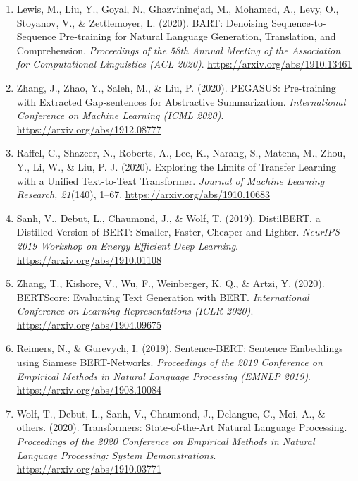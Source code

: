 \documentclass[12pt, a4paper]{report}
\begin{document}
\begin{enumerate}[leftmargin=*]
    \item Lewis, M., Liu, Y., Goyal, N., Ghazvininejad, M., Mohamed, A., Levy, O., Stoyanov, V., \& Zettlemoyer, L. (2020). BART: Denoising Sequence-to-Sequence Pre-training for Natural Language Generation, Translation, and Comprehension. \textit{Proceedings of the 58th Annual Meeting of the Association for Computational Linguistics (ACL 2020)}. \url{https://arxiv.org/abs/1910.13461}

    \item Zhang, J., Zhao, Y., Saleh, M., \& Liu, P. (2020). PEGASUS: Pre-training with Extracted Gap-sentences for Abstractive Summarization. \textit{International Conference on Machine Learning (ICML 2020)}. \url{https://arxiv.org/abs/1912.08777}

    \item Raffel, C., Shazeer, N., Roberts, A., Lee, K., Narang, S., Matena, M., Zhou, Y., Li, W., \& Liu, P. J. (2020). Exploring the Limits of Transfer Learning with a Unified Text-to-Text Transformer. \textit{Journal of Machine Learning Research, 21}(140), 1--67. \url{https://arxiv.org/abs/1910.10683}

    \item Sanh, V., Debut, L., Chaumond, J., \& Wolf, T. (2019). DistilBERT, a Distilled Version of BERT: Smaller, Faster, Cheaper and Lighter. \textit{NeurIPS 2019 Workshop on Energy Efficient Deep Learning}. \url{https://arxiv.org/abs/1910.01108}

    \item Zhang, T., Kishore, V., Wu, F., Weinberger, K. Q., \& Artzi, Y. (2020). BERTScore: Evaluating Text Generation with BERT. \textit{International Conference on Learning Representations (ICLR 2020)}. \url{https://arxiv.org/abs/1904.09675}

    \item Reimers, N., \& Gurevych, I. (2019). Sentence-BERT: Sentence Embeddings using Siamese BERT-Networks. \textit{Proceedings of the 2019 Conference on Empirical Methods in Natural Language Processing (EMNLP 2019)}. \url{https://arxiv.org/abs/1908.10084}

    \item Wolf, T., Debut, L., Sanh, V., Chaumond, J., Delangue, C., Moi, A., \& others. (2020). Transformers: State-of-the-Art Natural Language Processing. \textit{Proceedings of the 2020 Conference on Empirical Methods in Natural Language Processing: System Demonstrations}. \url{https://arxiv.org/abs/1910.03771}
\end{enumerate}
\end{document}
